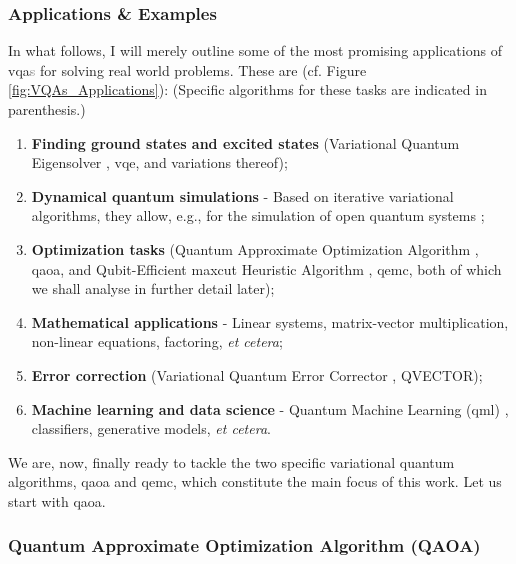 \subsubsection*{\small Applications \& Examples}
In what follows, I will merely outline some of the most promising applications of \acrshort{vqa}\textcolor{gray}{s} for solving real world problems. These are (cf. Figure \ref{fig:VQAs_Applications}): (Specific algorithms for these tasks are indicated in parenthesis.)
\begin{enumerate}
    \item \textbf{Finding ground states and excited states} (Variational Quantum Eigensolver \cite{Peruzzo_2014}, \acrshort{vqe}, and variations thereof);
    \item  \textbf{Dynamical quantum simulations} - Based on iterative variational algorithms, they allow, e.g., for the simulation of open quantum systems \cite{Cerezo_2021};
    \item \textbf{Optimization tasks} (Quantum Approximate Optimization Algorithm \cite{farhi2014quantum}, \acrshort{qaoa}, and Qubit-Efficient \acrshort{maxcut} Heuristic Algorithm \cite{tenecohen2023variational}, \acrshort{qemc}, both of which we shall analyse in further detail later);
    \item \textbf{Mathematical applications} \cite{Cerezo_2021} - Linear systems, matrix-vector multiplication, non-linear equations, factoring, \textit{et cetera};
    \item \textbf{Error correction} (Variational Quantum Error Corrector \cite{johnson2017qvector}, QVECTOR);
    \item \textbf{Machine learning and data science} - Quantum Machine Learning (\acrshort{qml}) \cite{Cerezo2022_QML}, classifiers, generative models, \textit{et cetera}.
\end{enumerate}

We are, now, finally ready to tackle the two specific variational quantum algorithms, \acrshort{qaoa} and \acrshort{qemc}, which constitute the main focus of this work. Let us start with \acrshort{qaoa}.

\subsubsection{Quantum Approximate Optimization Algorithm (QAOA)}
\label{subsubsection:QAOA}


